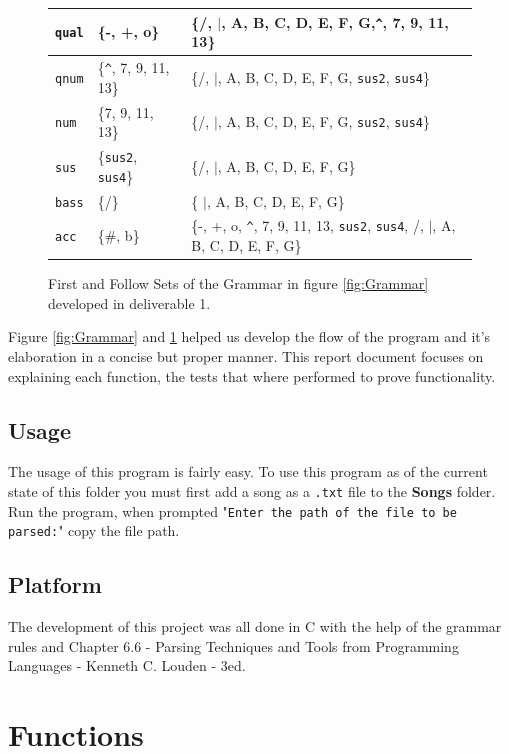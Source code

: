 \documentclass{article}
\begin{document}
\begin{figure}[H]
\begin{tabularx}{\textwidth}{l|X|X}
        \hline
        \lstinline|qual| & \{-, +, o\} 
        & \{/, $\vert$, A, B, C, D, E, F, G,\lstinline|^|, 7, 9, 11, 13\} \\
        \hline
        \lstinline|qnum| & \{\lstinline|^|, 7, 9, 11, 13\}  & \{/, $\vert$, A, B, C, D, E, F, G, \texttt{sus2}, \texttt{sus4}\}  \\
        \hline
        \lstinline|num| & \{7, 9, 11, 13\} 
        & \{/, $\vert$, A, B, C, D, E, F, G, \texttt{sus2}, \texttt{sus4}\} \\
        \hline
        \lstinline|sus| & \{\texttt{sus2}, \texttt{sus4}\} 
        & \{/, $\vert$, A, B, C, D, E, F, G\}  \\
        \hline
        \lstinline|bass| & \{/\} 
        & \{ $\vert$, A, B, C, D, E, F, G\}\\
        \hline
        \lstinline|acc| & \{\#, b\} 
        & \{-, +, o, \lstinline|^|, 7, 9, 11, 13, \texttt{sus2}, \texttt{sus4}, /, $\vert$, A, B, C, D, E, F, G\} \\
        \hline
    \end{tabularx}
    \caption{First and Follow Sets of the Grammar in figure \ref*{fig:Grammar} developed in deliverable 1.}
    \label{fig:FirstAndFollowSets}
\end{figure}
Figure \ref*{fig:Grammar} and \ref*{fig:FirstAndFollowSets} helped us develop the flow of the program and it's elaboration in a concise but proper manner. This report document focuses on explaining each function, the tests that where performed to prove functionality.
\subsection{Usage}
The usage of this program is fairly easy. To use this program as of the current state of this folder you must first add a song as a \texttt{.txt} file to the \textbf{Songs} folder. Run the program, when prompted "\texttt{Enter the path of the file to be parsed:}" copy the file path.
\subsection{Platform}
The development of this project was all done in C with the help of the grammar rules and Chapter 6.6 - Parsing Techniques and Tools from Programming Languages - Kenneth C. Louden - 3ed.
\section{Functions} \label{fig:Functions}
\end{document}
